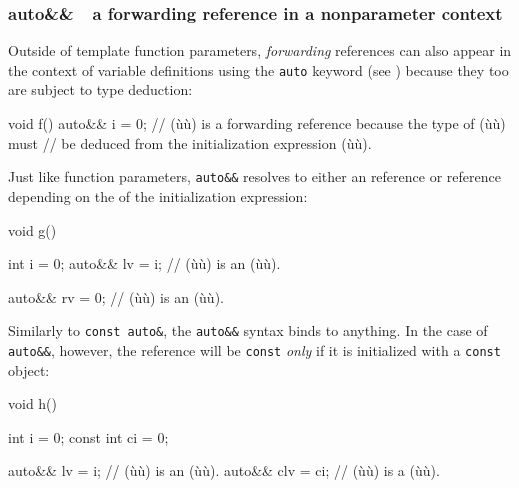 \subsubsection[\lstinline!auto&&! --- a forwarding reference in a nonparameter context]{{\SubsubsecCode auto\&\&}~{\subsubemdash}~a forwarding reference in a nonparameter context}\label{auto-a-forwarding-reference-in-a-non-parameter-context}

Outside of template function parameters, \emph{forwarding} references
can also appear in the context of variable definitions using the
\lstinline!auto! keyword (see ) 
because they too are subject to type
deduction:

\begin{emcppslisting}
void f()
{
    auto&& i = 0;  // (ù{}ù) is a forwarding reference because the type of (ù{}ù) must
                   // be deduced from the initialization expression (ù{}ù).
}
\end{emcppslisting}

\noindent Just like function parameters, \lstinline!auto&&! resolves to either an
 reference or  reference depending on the
 of the initialization expression:

\begin{emcppslisting}
void g()
{
    int i = 0;
    auto&& lv = i;  // (ù{}ù) is an (ù{}ù).

    auto&& rv = 0;  // (ù{}ù) is an (ù{}ù).
}
\end{emcppslisting}

\noindent Similarly to \lstinline!const!~\lstinline!auto&!, the \lstinline!auto&&!
syntax binds to anything. In the case of \lstinline!auto&&!, however, the reference will be \lstinline!const! \emph{only} if it is initialized with a \lstinline!const! object:

\begin{emcppslisting}
void h()
{
    int        i = 0;
    const int ci = 0;

    auto&& lv  = i;   // (ù{}ù) is an (ù{}ù).
    auto&& clv = ci;  // (ù{}ù) is a (ù{}ù).
}
\end{emcppslisting}

